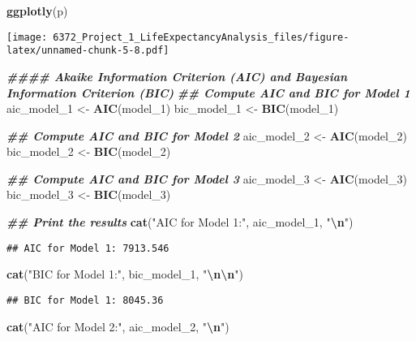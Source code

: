 \documentclass[
]{article}
\newenvironment{Shaded}{\begin{snugshade}}{\end{snugshade}}
\newcommand{\DocumentationTok}[1]{\textcolor[rgb]{0.56,0.35,0.01}{\textbf{\textit{#1}}}}
\newcommand{\FunctionTok}[1]{\textcolor[rgb]{0.13,0.29,0.53}{\textbf{#1}}}
\newcommand{\NormalTok}[1]{#1}
\newcommand{\OtherTok}[1]{\textcolor[rgb]{0.56,0.35,0.01}{#1}}
\newcommand{\SpecialCharTok}[1]{\textcolor[rgb]{0.81,0.36,0.00}{\textbf{#1}}}
\newcommand{\StringTok}[1]{\textcolor[rgb]{0.31,0.60,0.02}{#1}}
\begin{document}
\begin{Shaded}
\begin{Highlighting}[]
\FunctionTok{ggplotly}\NormalTok{(p)}
\end{Highlighting}
\end{Shaded}

\texttt{[image: 6372\_Project\_1\_LifeExpectancyAnalysis\_files/figure-latex/unnamed-chunk-5-8.pdf]}

\begin{Shaded}
\begin{Highlighting}[]
\DocumentationTok{\#\#\#\# Akaike Information Criterion (AIC) and Bayesian Information Criterion (BIC)}
\DocumentationTok{\#\# Compute AIC and BIC for Model 1}
\NormalTok{aic\_model\_1 }\OtherTok{\textless{}{-}} \FunctionTok{AIC}\NormalTok{(model\_1)}
\NormalTok{bic\_model\_1 }\OtherTok{\textless{}{-}} \FunctionTok{BIC}\NormalTok{(model\_1)}

\DocumentationTok{\#\# Compute AIC and BIC for Model 2}
\NormalTok{aic\_model\_2 }\OtherTok{\textless{}{-}} \FunctionTok{AIC}\NormalTok{(model\_2)}
\NormalTok{bic\_model\_2 }\OtherTok{\textless{}{-}} \FunctionTok{BIC}\NormalTok{(model\_2)}

\DocumentationTok{\#\# Compute AIC and BIC for Model 3}
\NormalTok{aic\_model\_3 }\OtherTok{\textless{}{-}} \FunctionTok{AIC}\NormalTok{(model\_3)}
\NormalTok{bic\_model\_3 }\OtherTok{\textless{}{-}} \FunctionTok{BIC}\NormalTok{(model\_3)}

\DocumentationTok{\#\# Print the results}
\FunctionTok{cat}\NormalTok{(}\StringTok{"AIC for Model 1:"}\NormalTok{, aic\_model\_1, }\StringTok{"}\SpecialCharTok{\textbackslash{}n}\StringTok{"}\NormalTok{)}
\end{Highlighting}
\end{Shaded}

\begin{verbatim}
## AIC for Model 1: 7913.546
\end{verbatim}

\begin{Shaded}
\begin{Highlighting}[]
\FunctionTok{cat}\NormalTok{(}\StringTok{"BIC for Model 1:"}\NormalTok{, bic\_model\_1, }\StringTok{"}\SpecialCharTok{\textbackslash{}n\textbackslash{}n}\StringTok{"}\NormalTok{)}
\end{Highlighting}
\end{Shaded}

\begin{verbatim}
## BIC for Model 1: 8045.36
\end{verbatim}

\begin{Shaded}
\begin{Highlighting}[]
\FunctionTok{cat}\NormalTok{(}\StringTok{"AIC for Model 2:"}\NormalTok{, aic\_model\_2, }\StringTok{"}\SpecialCharTok{\textbackslash{}n}\StringTok{"}\NormalTok{)}
\end{Highlighting}
\end{Shaded}
\end{document}
